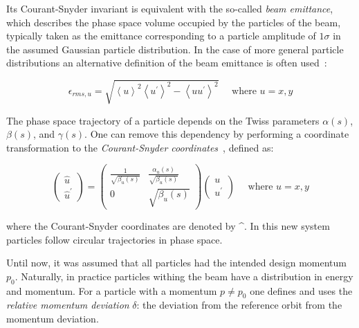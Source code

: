 Its Courant-Snyder invariant is equivalent with the so-called \emph{beam emittance}, which describes the phase space volume occupied by the particles of the beam, typically taken as the emittance corresponding to a particle amplitude of \(1 \sigma\) in the assumed Gaussian particle distribution.
In the case of more general particle distributions an alternative definition of the beam emittance is often used~\cite{CERN:Muller:Beam_Matter_Covariance_Matrix_Emittance, CERN:Buon:CAS_Beam_Phase_Space_Emittance}:

\begin{equation}
    \epsilon_{rms,u} = \sqrt{\left\langle u \right\rangle^{2} \left\langle u^{\prime} \right\rangle^{2} - \left\langle uu^{\prime} \right\rangle^{2}} \quad \text { where } u = x, y
    \label{equation:beam_emittance}
\end{equation}

The phase space trajectory of a particle depends on the Twiss parameters $\alpha(s)$, $\beta(s)$, and $\gamma(s)$.
One can remove this dependency by performing a coordinate transformation to the \emph{Courant-Snyder coordinates}~\cite{BOOK:Bazzani:Normal_Form_Approach_Betatron_Motion}, defined as:

\begin{equation}
    \left(\begin{array}{c}
    \hat{u} \\
    \hat{u}^{\prime}
    \end{array}\right) = \left(\begin{array}{cc}
    \frac{1}{\sqrt{\beta_{u}(s)}} & \frac{\alpha_{u}(s)}{\sqrt{\beta_{u}(s)}} \\
    0 & \sqrt{\beta_{u}(s)}
    \end{array}\right)\left(\begin{array}{c}
    u \\
    u^{\prime}
    \end{array}\right) \quad \text{ where } u = x, y
    \label{equation:courant_snyder_coordinates}
\end{equation}

where the Courant-Snyder coordinates are denoted by \^{}.
In this new system particles follow circular trajectories in phase space.

Until now, it was assumed that all particles had the intended design momentum \(p_{0}\).
Naturally, in practice particles withing the beam have a distribution in energy and momentum.
For a particle with a momentum \(p \neq p_{0}\) one defines and uses the \textit{relative momentum deviation} \(\delta\): the deviation from the reference orbit from the momentum deviation.

